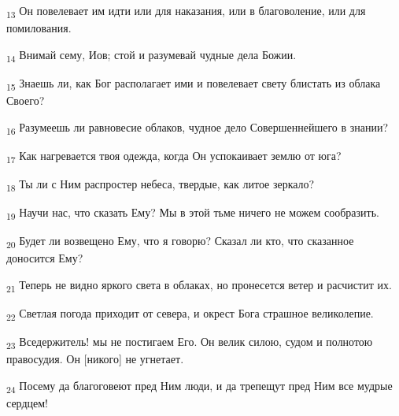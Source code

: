 \begin{tcolorbox}
\textsubscript{13} Он повелевает им идти или для наказания, или в благоволение, или для помилования.
\end{tcolorbox}
\begin{tcolorbox}
\textsubscript{14} Внимай сему, Иов; стой и разумевай чудные дела Божии.
\end{tcolorbox}
\begin{tcolorbox}
\textsubscript{15} Знаешь ли, как Бог располагает ими и повелевает свету блистать из облака Своего?
\end{tcolorbox}
\begin{tcolorbox}
\textsubscript{16} Разумеешь ли равновесие облаков, чудное дело Совершеннейшего в знании?
\end{tcolorbox}
\begin{tcolorbox}
\textsubscript{17} Как нагревается твоя одежда, когда Он успокаивает землю от юга?
\end{tcolorbox}
\begin{tcolorbox}
\textsubscript{18} Ты ли с Ним распростер небеса, твердые, как литое зеркало?
\end{tcolorbox}
\begin{tcolorbox}
\textsubscript{19} Научи нас, что сказать Ему? Мы в этой тьме ничего не можем сообразить.
\end{tcolorbox}
\begin{tcolorbox}
\textsubscript{20} Будет ли возвещено Ему, что я говорю? Сказал ли кто, что сказанное доносится Ему?
\end{tcolorbox}
\begin{tcolorbox}
\textsubscript{21} Теперь не видно яркого света в облаках, но пронесется ветер и расчистит их.
\end{tcolorbox}
\begin{tcolorbox}
\textsubscript{22} Светлая погода приходит от севера, и окрест Бога страшное великолепие.
\end{tcolorbox}
\begin{tcolorbox}
\textsubscript{23} Вседержитель! мы не постигаем Его. Он велик силою, судом и полнотою правосудия. Он [никого] не угнетает.
\end{tcolorbox}
\begin{tcolorbox}
\textsubscript{24} Посему да благоговеют пред Ним люди, и да трепещут пред Ним все мудрые сердцем!
\end{tcolorbox}
